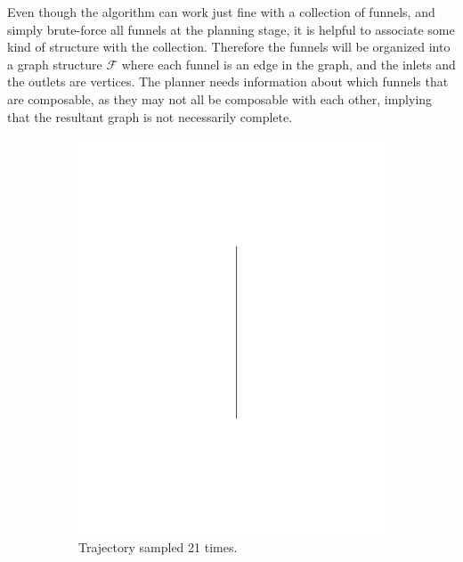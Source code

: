 Even though the \rrtfunnel{} algorithm can work just fine with a collection of
funnels, and simply brute-force all funnels at the planning stage, it is helpful
to associate some kind of structure with the collection. Therefore the funnels
will be organized into a graph structure \(\mathcal{F}\) where each funnel is an
edge in the graph, and the inlets and the outlets are vertices. The planner
needs information about which funnels that are composable, as they may not all
be composable with each other, implying that the resultant graph is not
necessarily complete.

\begin{figure}
  \centering
  \begin{subfigure}[b]{0.5\textwidth}
    \includegraphics[trim={5cm 5cm 5cm 5cm},
    width=\textwidth]{figures/method/trajectory-sampled}
    \caption{Trajectory sampled 21 times.\newline}
  \end{subfigure}%
  \begin{subfigure}[b]{0.5\textwidth}

\end{subfigure}
\end{figure}
